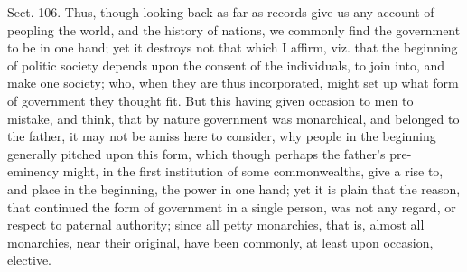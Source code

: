 \documentclass[11pt,openany]{book}
\begin{document}
Sect. 106. Thus, though looking back as far as records give us any account of peopling the world, and the history of nations, we commonly find the government to be in one hand; yet it destroys not that which I affirm, viz. that the beginning of politic society depends upon the consent of the individuals, to join into, and make one society; who, when they are thus incorporated, might set up what form of government they thought fit. But this having given occasion to men to mistake, and think, that by nature government was monarchical, and belonged to the father, it may not be amiss here to consider, why people in the beginning generally pitched upon this form, which though perhaps the father's pre-eminency might, in the first institution of some commonwealths, give a rise to, and place in the beginning, the power in one hand; yet it is plain that the reason, that continued the form of government in a single person, was not any regard, or respect to paternal authority; since all petty monarchies, that is, almost all monarchies, near their original, have been commonly, at least upon occasion, elective.
\end{document}

